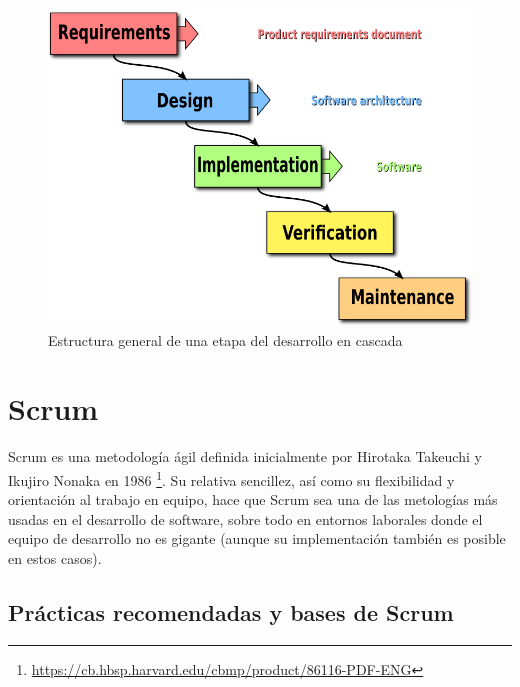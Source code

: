\begin{figure}[H]
		\includegraphics[width=\textwidth,height=\textheight,keepaspectratio]{./img/Waterfall_model.png}
	\caption{Estructura general de una etapa del desarrollo en cascada}
	\label{fig:cascadadesarrollo}
\end{figure}

\section{Scrum}

Scrum es una metodología ágil definida inicialmente por Hirotaka Takeuchi y Ikujiro Nonaka en 1986 \footnote{\url{https://cb.hbsp.harvard.edu/cbmp/product/86116-PDF-ENG}}. Su relativa sencillez, así como su flexibilidad y orientación al trabajo en equipo, hace que Scrum sea una de las metologías más usadas en el desarrollo de software, sobre todo en entornos laborales donde el equipo de desarrollo no es gigante (aunque su implementación también es posible en estos casos).

\subsection{Prácticas recomendadas y bases de Scrum}

